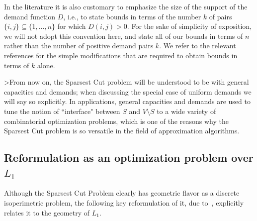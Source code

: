 \documentclass{icm2010}
\theoremstyle{definition}
\newcommand{\1}{\mathbf{1}}
\begin{document}
In the literature it is also customary to emphasize the size of the
support of the demand function $D$, i.e., to state bounds in terms
of the number $k$ of pairs $\{i,j\}\subseteq \{1,\ldots,n\}$ for
which $D(i,j)>0$. For the sake of simplicity of exposition, we will
not adopt this convention here, and state all of our bounds in terms
of $n$ rather than the number of positive demand pairs $k$. We refer
to the relevant references for the simple modifications that are
required to obtain bounds in terms of $k$ alone.

>From now on, the  Sparsest Cut problem will be understood to be with
general capacities and demands; when discussing the special case of
uniform demands we will say so explicitly. In applications, general
capacities and demands are used to tune the notion of ``interface"
between $S$ and $V\setminus S$ to a wide variety of combinatorial
optimization problems, which is
 one of the reasons why the Sparsest Cut problem is so versatile in the field of approximation algorithms.

\subsection{Reformulation as an optimization problem over $L_1$}
Although the Sparsest Cut Problem clearly has geometric flavor as a
discrete isoperimetric problem, the following key reformulation of
it, due to~\cite{AvisDeza,LLR95}, explicitly relates it to the
geometry of $L_1$.
\end{document}
